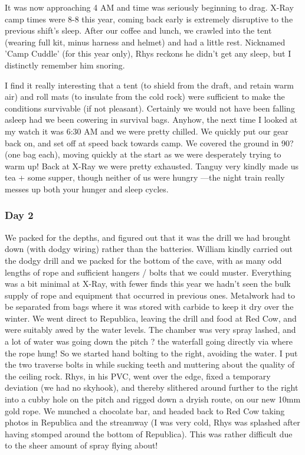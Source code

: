 \documentclass[onecolumn]{book}
\begin{document}
It was now approaching 4 AM and time was seriously beginning to drag. X-Ray camp times were 8-8 this year, coming back early is extremely disruptive to the previous shift's sleep. After our coffee and lunch, we crawled into the tent (wearing full kit, minus harness and helmet) and had a little rest. Nicknamed 'Camp Cuddle' (for this year only), Rhys reckons he didn't get any sleep, but I distinctly remember him snoring.

I find it really interesting that a tent (to shield from the draft, and retain warm air) and roll mats (to insulate from the cold rock) were sufficient to make the conditions survivable (if not pleasant). Certainly we would not have been falling asleep had we been cowering in survival bags.
Anyhow, the next time I looked at my watch it was 6:30 AM and we were pretty chilled. We quickly put our gear back on, and set off at speed back towards camp. We covered the ground in 90? (one bag each), moving quickly at the start as we were desperately trying to warm up!
Back at X-Ray we were pretty exhausted. Tanguy very kindly made us tea + some supper, though neither of us were hungry ---the night train really messes up both your hunger and sleep cycles.

\subsubsection{Day 2}
We packed for the depths, and figured out that it was the drill we had brought down (with dodgy wiring) rather than the batteries. William kindly carried out the dodgy drill and we packed for the bottom of the cave, with as many odd lengths of rope and sufficient hangers / bolts that we could muster. Everything was a bit minimal at X-Ray, with fewer finds this year we hadn't seen the bulk supply of rope and equipment that occurred in previous ones. Metalwork had to be separated from bags where it was stored with carbide to keep it dry over the winter.
We went direct to Republica, leaving the drill and food at Red Cow, and were suitably awed by the water levels. The chamber was very spray lashed, and a lot of water was going down the pitch ? the waterfall going directly via where the rope hung!
So we started hand bolting to the right, avoiding the water. I put the two traverse bolts in while sucking teeth and muttering about the quality of the ceiling rock. Rhys, in his PVC, went over the edge, fixed a temporary deviation (we had no skyhook), and thereby slithered around further to the right into a cubby hole on the pitch and rigged down a dryish route, on our new 10mm gold rope. We munched a chocolate bar, and headed back to Red Cow taking photos in Republica and the streamway (I was very cold, Rhys was splashed after having stomped around the bottom of Republica). This was rather difficult due to the sheer amount of spray flying about!
\end{document}
